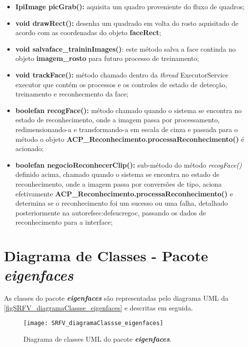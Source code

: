 \begin{itemize}
\begin{itemize}
		\item \textbf{IpiImage picGrab():} aquisita um quadro proveniente do fluxo de quadros;
		
		\item \textbf{void drawRect():} desenha um quadrado em volta do rosto aquisitado de acordo com as coordenadas do objeto \textbf{faceRect};
		
		\item \textbf{void salvaface\_traininImages()}: este método salva a face continda no objeto \textbf{imagem\_rosto} para futuro processo de treinamento;
		
		\item \textbf{void trackFace():} método chamado dentro da \textit{thread} ExecutorService executor que contém os processos e os controles de estado de detecção, treinamento e reconhecmento da face;
		
		\item \textbf{boolefan recogFace():} método chamado quando o sistema se encontra no estado de reconhecimento, onde a imagem passa por processamento, redimensionando-a e transformando-a em escala de cinza e passada para o método o objeto \textbf{ACP\_Reconhecimento.processaReconhecimento()} é acionado;
		
		\item \textbf{boolefan negocioReconhecerClip():} sub-método do método \textit{recogFace()} definido acima, chamado quando o sistema se encontra no estado de reconhecimento, onde a imagem passa por conversões de tipo,  aciona efetivamente \textbf{ACP\_Reconhecimento.processaReconhecimento()} e determina se o reconhecimento foi um sucesso ou uma falha, detalhado posteriormente na autoref{sec:defsucregoc}, passando os dados de reconhecimento para a interface;
	\end{itemize}
\end{itemize}

\section{Diagrama de Classes - Pacote \textit{\textbf{eigenfaces}}}\label{sec:eigenfacesclass}
As classes do pacote \textbf{\textit{eigenfaces}} são representadas pelo diagrama UML da \autoref{figSRFV_diagramaClassse_eigenfaces} e descritas em seguida. 

\begin{figure}[h]
	\centering
	\texttt{[image: SRFV\_diagramaClassse\_eigenfaces]}
	\caption{Diagrama de classes UML do pacote \textbf{\textit{eigenfaces}}.}
	\label{figSRFV_diagramaClassse_eigenfaces}
\end{figure}

